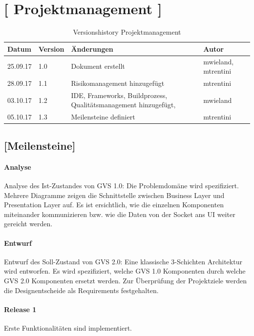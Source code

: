 \documentclass[11pt,a4paper,english,oneside]{book}
\numberwithin{equation}{chapter}
\begin{document}
	
	
	
	
	
	\chapter{ [ Projektmanagement ]}
	
	
	\begin{table}[h!]
		\centering
		\begin{tabularx}{\linewidth}{l l X l}
			\toprule 
			Datum & Version & Änderungen & Autor \\
			\midrule
			25.09.17 & 1.0 & Dokument erstellt & mwieland, mtrentini \\
			28.09.17 & 1.1 & Risikomanagement hinzugefügt & mtrentini \\
			03.10.17 & 1.2 & IDE, Frameworks, Buildprozess, Qualitätsmanagement hinzugefügt, & mwieland \\
			05.10.17 & 1.3 & Meilensteine definiert & mtrentini \\
			\bottomrule 
		\end{tabularx} 
		\caption{Versionshistory Projektmanagement} 
	\end{table}
	
	\section{[Meilensteine]}
	
	\subsubsection{Analyse}
	Analyse des Ist-Zustandes von GVS 1.0: Die Problemdomäne wird spezifiziert. Mehrere Diagramme zeigen die Schnittstelle zwischen Business Layer und Presentation Layer auf. Es ist ersichtlich, wie die einzelnen Komponenten miteinander kommunizieren bzw. wie die Daten von der Socket ans UI weiter gereicht werden.
	
	\subsubsection{Entwurf}
	\label{milestone2}
	Entwurf des Soll-Zustand von GVS 2.0: Eine klassische 3-Schichten Architektur wird entworfen. Es wird spezifiziert, welche GVS 1.0 Komponenten durch welche GVS 2.0 Komponenten ersetzt werden. Zur Überprüfung der Projektziele werden die Designentscheide als Requirements festgehalten.
	
	\subsubsection{Release 1}
	Erste Funktionalitäten sind implementiert.
	
\end{document}
